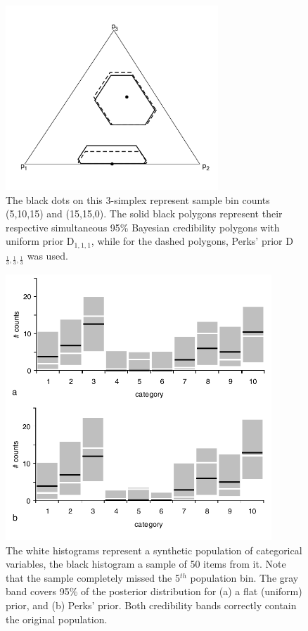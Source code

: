 \documentclass{article}
\begin{document}
\begin{figure}[here]
  \centering
  \label{fig:compPriors}
  \includegraphics[width=8cm]{9.pdf}
  \caption{
The black dots on this 3-simplex represent sample bin counts (5,10,15)
and (15,15,0).   The solid  black polygons represent  their respective
simultaneous  95\% Bayesian  credibility polygons  with  uniform prior
D$_{1,1,1}$,   while   for   the   dashed   polygons,   Perks'   prior
D$_{\frac{1}{3},\frac{1}{3},\frac{1}{3}}$ was used.}
\end{figure}

\begin{figure}[here]
  \centering
  \includegraphics[width=10cm]{syntheticHist.pdf}
  \caption{
The white  histograms represent a synthetic  population of categorical
variables, the  black histogram  a sample of  50 items from  it.  Note
that the  sample completely missed  the 5$^{th}$ population  bin.  The
gray band  covers 95\%  of the posterior  distribution for (a)  a flat
(uniform)  prior,  and  (b)  Perks'  prior.   Both  credibility  bands
correctly contain the original population.}
  \label{fig:dirHist}
\end{figure}
\end{document}
